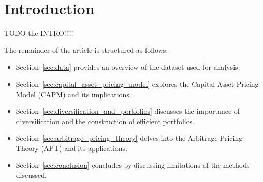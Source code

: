 \section{Introduction}
\label{sec:introduction}
TODO the INTRO!!!!!

The remainder of the article is structured as follows:
\begin{itemize}
    \item Section~\ref{sec:data} provides an overview of the dataset used for analysis.
    \item Section~\ref{sec:capital_asset_pricing_model} explores the Capital Asset Pricing Model (CAPM) and its implications.
    \item Section~\ref{sec:diversification_and_portfolios} discusses the importance of diversification and the construction of efficient portfolios.
    \item Section~\ref{sec:arbitrage_pricing_theory} delves into the Arbitrage Pricing Theory (APT) and its applications.
    \item Section~\ref{sec:conclusion} concludes by discussing limitations of the methods discussed.
\end{itemize}